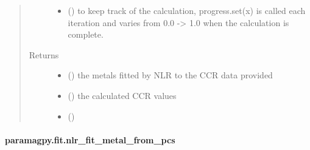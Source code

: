 \documentclass[a4paper,10pt,english]{sphinxmanual}
\begin{document}
\begin{fulllineitems}
\begin{quote}
\begin{description}
\begin{itemize}
\item {} 
 (\sphinxstyleliteralemphasis{\sphinxupquote{, }}) \textendash{} to keep track of the calculation, progress.set(x) is called each
iteration and varies from 0.0 -\textgreater{} 1.0 when the calculation is complete.

\end{itemize}

\item[{Returns}] \leavevmode
\begin{itemize}
\item {} 
 () \textendash{} the metals fitted by NLR to the CCR data provided

\item {} 
 () \textendash{} the calculated CCR values

\item {} 
 ()

\end{itemize}


\end{description}\end{quote}

\end{fulllineitems}



\paragraph{paramagpy.fit.nlr\_fit\_metal\_from\_pcs}
\label{\detokenize{reference/generated/paramagpy.fit.nlr_fit_metal_from_pcs:paramagpy-fit-nlr-fit-metal-from-pcs}}\label{\detokenize{reference/generated/paramagpy.fit.nlr_fit_metal_from_pcs::doc}}
\end{document}
